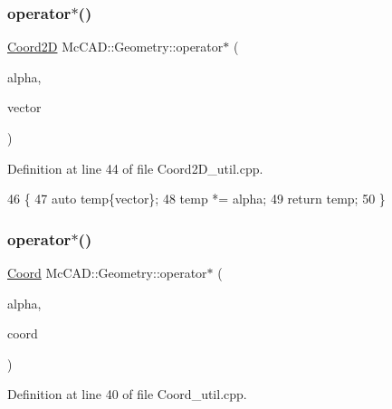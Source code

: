 \subsubsection{\texorpdfstring{operator$\ast$()}{operator*()}\hspace{0.1cm}{\footnotesize\ttfamily [2/9]}}
{\footnotesize\ttfamily \hyperlink{classMcCAD_1_1Geometry_1_1Coord2D}{Coord2D} Mc\+C\+A\+D\+::\+Geometry\+::operator$\ast$ (\begin{DoxyParamCaption}\item[{const \hyperlink{namespaceMcCAD_1_1Geometry_ac043b37a4a7e849fca22869e1982d2f8}{coord\+\_\+type} \&}]{alpha,  }\item[{const \hyperlink{classMcCAD_1_1Geometry_1_1Coord2D}{Coord2D} \&}]{vector }\end{DoxyParamCaption})}



Definition at line 44 of file Coord2\+D\+\_\+util.\+cpp.


\begin{DoxyCode}
46                               \{
47     \textcolor{keyword}{auto} temp\{vector\};
48     temp *= alpha;
49     \textcolor{keywordflow}{return} temp;
50 \}
\end{DoxyCode}
\mbox{\label{namespaceMcCAD_1_1Geometry_a9251d276073fda7c8b5f28cc26d11900}} 
\subsubsection{\texorpdfstring{operator$\ast$()}{operator*()}\hspace{0.1cm}{\footnotesize\ttfamily [3/9]}}
{\footnotesize\ttfamily \hyperlink{classMcCAD_1_1Geometry_1_1Coord}{Coord} Mc\+C\+A\+D\+::\+Geometry\+::operator$\ast$ (\begin{DoxyParamCaption}\item[{const \hyperlink{namespaceMcCAD_1_1Geometry_ac043b37a4a7e849fca22869e1982d2f8}{coord\+\_\+type} \&}]{alpha,  }\item[{const \hyperlink{classMcCAD_1_1Geometry_1_1Coord}{Coord} \&}]{coord }\end{DoxyParamCaption})}



Definition at line 40 of file Coord\+\_\+util.\+cpp.


